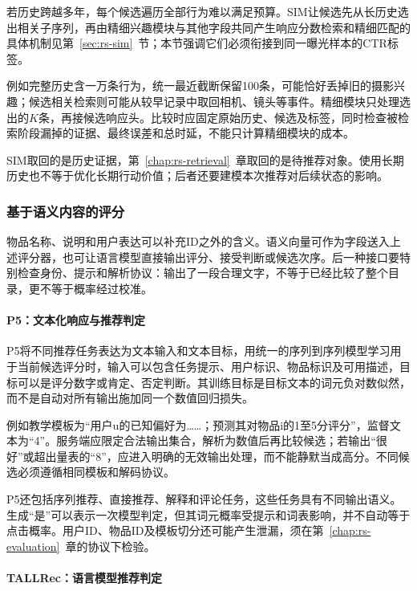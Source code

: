 若历史跨越多年，每个候选遍历全部行为难以满足预算。SIM让候选先从长历史选出相关子序列，再由精细兴趣模块与其他字段共同产生响应分数检索和精细匹配的具体机制见第~\ref{sec:rs-sim}~节；本节强调它们必须衔接到同一曝光样本的CTR标签。

例如完整历史含一万条行为，统一最近截断保留100条，可能恰好丢掉旧的摄影兴趣；候选相关检索则可能从较早记录中取回相机、镜头等事件。精细模块只处理选出的$K$条，再接候选响应头。比较时应固定原始历史、候选及标签，同时检查被检索阶段漏掉的证据、最终误差和总时延，不能只计算精细模块的成本。

SIM取回的是历史证据，第~\ref{chap:rs-retrieval}~章取回的是待推荐对象。使用长期历史也不等于优化长期行动价值；后者还要建模本次推荐对后续状态的影响。

\subsubsection{基于语义内容的评分}
\label{sec:rs-semantic-scoring}

物品名称、说明和用户表达可以补充ID之外的含义。语义向量可作为字段送入上述评分器，也可让语言模型直接输出评分、接受判断或候选次序。后一种接口要特别检查身份、提示和解析协议：输出了一段合理文字，不等于已经比较了整个目录，更不等于概率经过校准。

\paragraph{P5：文本化响应与推荐判定}
\label{sec:rs-p5-scoring}

P5将不同推荐任务表达为文本输入和文本目标，用统一的序列到序列模型学习用于当前候选评分时，输入可以包含任务提示、用户标识、物品标识及可用描述，目标可以是评分数字或肯定、否定判断。其训练目标是目标文本的词元负对数似然，而不是自动对所有输出施加同一个数值回归损失。

例如教学模板为“用户u的已知偏好为……；预测其对物品i的1至5分评分”，监督文本为“4”。服务端应限定合法输出集合，解析为数值后再比较候选；若输出“很好”或超出量表的“8”，应进入明确的无效输出处理，而不能静默当成高分。不同候选必须遵循相同模板和解码协议。

P5还包括序列推荐、直接推荐、解释和评论任务，这些任务具有不同输出语义。生成“是”可以表示一次模型判定，但其词元概率受提示和词表影响，并不自动等于点击概率。用户ID、物品ID及模板切分还可能产生泄漏，须在第~\ref{chap:rs-evaluation}~章的协议下检验。

\paragraph{TALLRec：语言模型推荐判定}
\label{sec:rs-tallrec}

